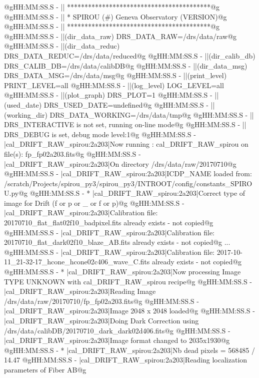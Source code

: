 \begin{cmdboxprintspecial}[fontupper=\tiny, fontlower=\tiny]
@gHH:MM:SS.S -   || *****************************************@g
@gHH:MM:SS.S -   || * SPIROU \@(#) Geneva Observatory (VERSION)@g
@gHH:MM:SS.S -   || *****************************************@g
@gHH:MM:SS.S -   ||(dir_data_raw)      DRS_DATA_RAW=/drs/data/raw@g
@gHH:MM:SS.S -   ||(dir_data_reduc)    DRS_DATA_REDUC=/drs/data/reduced@g
@gHH:MM:SS.S -   ||(dir_calib_db)      DRS_CALIB_DB=/drs/data/calibDB@g
@gHH:MM:SS.S -   ||(dir_data_msg)      DRS_DATA_MSG=/drs/data/msg@g
@gHH:MM:SS.S -   ||(print_level)       PRINT_LEVEL=all         %
@gHH:MM:SS.S -   ||(log_level)         LOG_LEVEL=all         %
@gHH:MM:SS.S -   ||(plot_graph)        DRS_PLOT=1            %
@gHH:MM:SS.S -   ||(used_date)         DRS_USED_DATE=undefined@g
@gHH:MM:SS.S -   ||(working_dir)       DRS_DATA_WORKING=/drs/data/tmp@g
@gHH:MM:SS.S -   ||                    DRS_INTERACTIVE is not set, running on-line mode@g
@gHH:MM:SS.S -   ||                    DRS_DEBUG is set, debug mode level:1@g
@gHH:MM:SS.S -   |cal_DRIFT_RAW_spirou:2a203|Now running : cal_DRIFT_RAW_spirou on file(s): fp_fp02a203.fits@g
@gHH:MM:SS.S -   |cal_DRIFT_RAW_spirou:2a203|On directory /drs/data/raw/20170710@g
@gHH:MM:SS.S -   |cal_DRIFT_RAW_spirou:2a203|ICDP_NAME loaded from: /scratch/Projects/spirou_py3/spirou_py3/INTROOT/config/constants_SPIROU.py@g
@gHH:MM:SS.S - * |cal_DRIFT_RAW_spirou:2a203|Correct type of image for Drift (f or p or _ or f or p)@g
@gHH:MM:SS.S -   |cal_DRIFT_RAW_spirou:2a203|Calibration file: 20170710_flat_flat02f10_badpixel.fits already exists - not copied@g
@gHH:MM:SS.S -   |cal_DRIFT_RAW_spirou:2a203|Calibration file: 20170710_flat_dark02f10_blaze_AB.fits already exists - not copied@g
...
@gHH:MM:SS.S -   |cal_DRIFT_RAW_spirou:2a203|Calibration file: 2017-10-11_21-32-17_hcone_hcone02c406_wave_C.fits already exists - not copied@g
@gHH:MM:SS.S - * |cal_DRIFT_RAW_spirou:2a203|Now processing Image TYPE UNKNOWN with cal_DRIFT_RAW_spirou recipe@g
@gHH:MM:SS.S -   |cal_DRIFT_RAW_spirou:2a203|Reading Image /drs/data/raw/20170710/fp_fp02a203.fits@g
@gHH:MM:SS.S -   |cal_DRIFT_RAW_spirou:2a203|Image 2048 x 2048 loaded@g
@gHH:MM:SS.S -   |cal_DRIFT_RAW_spirou:2a203|Doing Dark Correction using /drs/data/calibDB/20170710_dark_dark02d406.fits@g
@gHH:MM:SS.S -   |cal_DRIFT_RAW_spirou:2a203|Image format changed to 2035x1930@g
@gHH:MM:SS.S - * |cal_DRIFT_RAW_spirou:2a203|Nb dead pixels = 568485 / 14.47 %
@gHH:MM:SS.S -   |cal_DRIFT_RAW_spirou:2a203|Reading localization parameters of Fiber AB@g

\end{cmdboxprintspecial}
